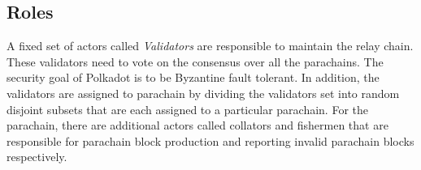 \subsection{Roles}
A fixed set of actors called \emph{Validators} are responsible to maintain the relay chain.
These validators need to vote on the consensus over all the parachains.
The security goal of Polkadot is to be Byzantine fault tolerant.
In addition, the validators are assigned to parachain by dividing the validators set into
random disjoint subsets that are each assigned to a particular parachain.
For the parachain, there are additional actors called collators and fishermen that are
responsible for parachain block production and reporting invalid parachain blocks respectively.
